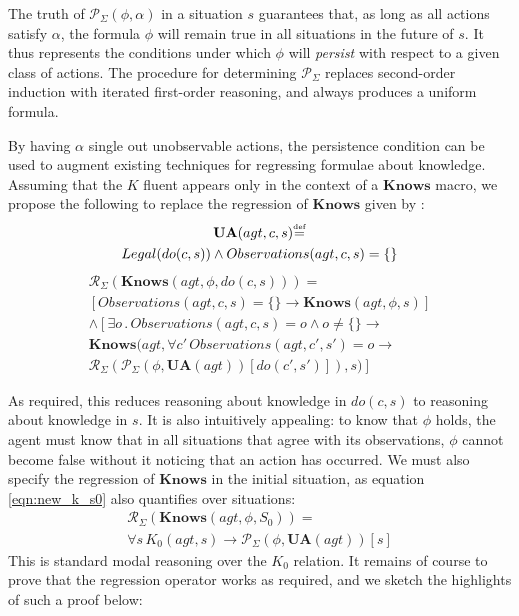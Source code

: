 \documentclass[letterpaper]{article}
\newcommand{\isdef}{\hbox{$\stackrel{\mbox{\tiny def}}{=}$}}
\begin{document}
The truth of $\mathcal{P}_{\Sigma}(\phi,\alpha)$ in a situation $s$
guarantees that, as long as all actions satisfy $\alpha$, the formula
$\phi$ will remain true in all situations in the future of $s$.
It thus represents the conditions under which $\phi$ will \emph{persist}
with respect to a given class of actions. The procedure for determining
$\mathcal{P}_{\Sigma}$ replaces second-order induction with iterated
first-order reasoning, and always produces a uniform formula.

By having $\alpha$ single out unobservable actions, the persistence
condition can be used to augment existing techniques for regressing
formulae about knowledge. Assuming that the $K$ fluent appears only
in the context of a $\mathbf{Knows}$ macro, we propose the following
to replace the regression of $\mathbf{Knows}$ given by \cite{scherl03sc_knowledge}:\begin{multline*}
\mathbf{UA}(agt,c,s)\isdef\\
Legal(do(c,s))\wedge Observations(agt,c,s)=\{\}\end{multline*}
\begin{multline}
\mathcal{R}_{\Sigma}(\mathbf{Knows}(agt,\phi,do(c,s)))=\\
\left[Observations(agt,c,s)=\{\}\rightarrow\mathbf{Knows}(agt,\phi,s)\right]\\
\wedge\left[\exists o\,.\, Observations(agt,c,s)=o\wedge o\neq\{\}\rightarrow\right.\\
\mathbf{Knows}(agt,\forall c'\, Observations(agt,c',s')=o\rightarrow\\
\left.\mathcal{R}_{\Sigma}(\mathcal{P}_{\Sigma}(\phi,\mathbf{UA}(agt))[do(c',s')]),s)\right]\end{multline}


As required, this reduces reasoning about knowledge in $do(c,s)$
to reasoning about knowledge in $s$. It is also intuitively appealing:
to know that $\phi$ holds, the agent must know that in all situations
that agree with its observations, $\phi$ cannot become false without
it noticing that an action has occurred. We must also specify the
regression of $\mathbf{Knows}$ in the initial situation, as equation
\ref{eqn:new_k_s0} also quantifies over situations:\begin{multline}
\mathcal{R}_{\Sigma}(\mathbf{Knows}(agt,\phi,S_{0}))=\\
\forall s\, K_{0}(agt,s)\rightarrow\mathcal{P}_{\Sigma}(\phi,\mathbf{UA}(agt))[s]\end{multline}
This is standard modal reasoning over the $K_{0}$ relation. It remains
of course to prove that the regression operator works as required,
and we sketch the highlights of such a proof below:
\end{document}
